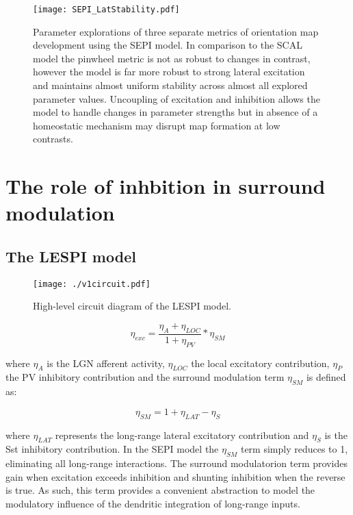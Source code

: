 \begin{figure}
	\centering
        \texttt{[image: SEPI\_LatStability.pdf]}
	\caption{Parameter explorations of three separate metrics of
          orientation map development using the SEPI model. In
          comparison to the SCAL model the pinwheel metric is not as
          robust to changes in contrast, however the model is far more
          robust to strong lateral excitation and maintains almost
          uniform stability across almost all explored parameter
          values. Uncoupling of excitation and inhibition allows the
          model to handle changes in parameter strengths but in
          absence of a homeostatic mechanism may disrupt map formation
          at low contrasts.}
	\label{SEPIStability}
\end{figure}


\section{The role of inhbition in surround modulation}


\subsection{The LESPI model}

\begin{figure}
	\centering
	\texttt{[image: ./v1circuit.pdf]}
	\caption[]{High-level circuit diagram of the LESPI model.}
    \label{circuit_diagram}
\end{figure}


\begin{equation}
  \eta_{exc} = \frac{\eta_{A} + \eta_{LOC}}{1 + \eta_{PV}} * \eta_{SM}
\end{equation}

where $\eta_{A}$ is the LGN afferent activity, $\eta_{LOC}$ the local
excitatory contribution, $\eta_{P}$ the PV inhibitory contribution
and the surround modulation term $\eta_{SM}$ is defined as:

\begin{equation}
  \eta_{SM} = 1 + \eta_{LAT} - \eta_{S}
\end{equation}

where $\eta_{LAT}$ represents the long-range lateral excitatory
contribution and $\eta_{S}$ is the Sst inhibitory contribution. In the
SEPI model the $\eta_{SM}$ term simply reduces to 1, eliminating all
long-range interactions. The surround modulatorion term provides gain
when excitation exceeds inhibition and shunting inhibition when the
reverse is true. As such, this term provides a convenient abstraction
to model the modulatory influence of the dendritic integration of
long-range inputs.

